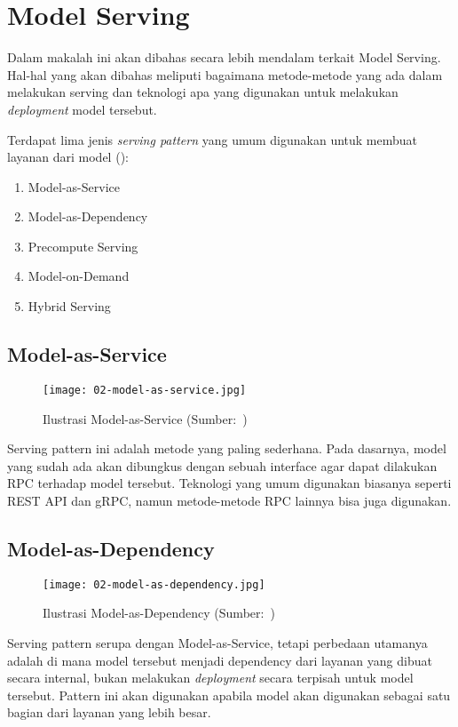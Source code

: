\section{Model Serving}

Dalam makalah ini akan dibahas secara lebih mendalam terkait Model Serving.
Hal-hal yang akan dibahas meliputi bagaimana metode-metode yang ada dalam melakukan serving dan teknologi apa yang digunakan untuk melakukan \textit{deployment} model tersebut.

Terdapat lima jenis \textit{serving pattern} yang umum digunakan untuk membuat layanan dari model (\cite{mlopsorg}):
\begin{enumerate}
  \item Model-as-Service
  \item Model-as-Dependency
  \item Precompute Serving
  \item Model-on-Demand
  \item Hybrid Serving
\end{enumerate}

\subsection{Model-as-Service}

\begin{figure}
  \centering
  \texttt{[image: 02-model-as-service.jpg]}
  \caption{Ilustrasi Model-as-Service (Sumber:~\cite{book-handsonml})}
\end{figure}

Serving pattern ini adalah metode yang paling sederhana.
Pada dasarnya, model yang sudah ada akan dibungkus dengan sebuah interface agar dapat dilakukan RPC terhadap model tersebut.
Teknologi yang umum digunakan biasanya seperti REST API dan gRPC, namun metode-metode RPC lainnya bisa juga digunakan.

\subsection{Model-as-Dependency}

\begin{figure}
  \centering
  \texttt{[image: 02-model-as-dependency.jpg]}
  \caption{Ilustrasi Model-as-Dependency (Sumber:~\cite{book-handsonml})}
\end{figure}

Serving pattern serupa dengan Model-as-Service, tetapi perbedaan utamanya adalah di mana model tersebut menjadi dependency dari layanan yang dibuat secara internal, bukan melakukan \textit{deployment} secara terpisah untuk model tersebut.
Pattern ini akan digunakan apabila model akan digunakan sebagai satu bagian dari layanan yang lebih besar.

